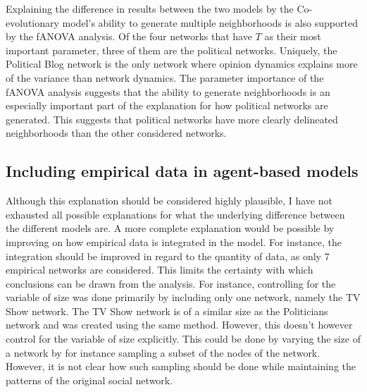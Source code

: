 \documentclass[11pt]{article}
\begin{document}
Explaining the difference in results between the two models by the Co-evolutionary model's ability to generate multiple neighborhoods is also supported by the fANOVA analysis. 
Of the four networks that have $T$ as their most important parameter, three of them are the political networks. Uniquely, the Political Blog network is the only network where opinion dynamics explains more of the variance than network dynamics. The parameter importance of the fANOVA analysis suggests that the ability to generate neighborhoods is an especially important part of the explanation for how political networks are generated. This suggests that political networks have more clearly delineated neighborhoods than the other considered networks. 

\subsection{Including empirical data in agent-based models}
Although this explanation should be considered highly plausible, I have not exhausted all possible explanations for what the underlying difference between the different models are. A more complete explanation would be possible by improving on how empirical data is integrated in the model. 
For instance, the integration should be improved in regard to the quantity of data, as only 7 empirical networks are considered. This limits the certainty with which conclusions can be drawn from the analysis. For instance, controlling for the variable of size was done primarily by including only one network, namely the TV Show network. The TV Show network is of a similar size as the Politicians network and was created using the same method. However, this doesn't however control for the variable of size explicitly. This could be done by varying the size of a network by for instance sampling a subset of the nodes of the network. However, it is not clear how such sampling should be done while maintaining the patterns of the original social network. 
\end{document}
